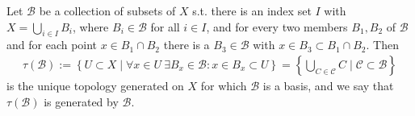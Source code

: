 \begin{theorem}\label{thrm:gen_top_by_coll_subsets}
	Let $\mathscr B$ be a collection of subsets of $X$ s.t. there is an index set $I$ with $X = \bigcup_{i\in I}B_i$, where $B_i\in\mathscr B$ for all $i\in I$, and for every two members $B_1, B_2$ of $\mathscr B$ and for each point $x\in B_1\cap B_2$ there is a $B_3\in\mathscr B$ with $x\in B_3\subset B_1\cap B_2$. Then 
	\begin{align}\label{eq:gen_top_by_coll_subsets}
		\tau(\mathscr B) := \left\{ U\subset X \mid \forall x\in U\ \exists B_x\in\mathscr B: x\in B_x\subset U\right\} = \left\{ \bigcup_{C\in\mathscr C} C \mid \mathscr C \subset \mathscr B \right\}
	\end{align} is the unique topology generated on $X$ for which $\mathscr B$ is a basis, and we say that $\tau(\mathscr B)$ is generated by $\mathscr B$.
\end{theorem}	

